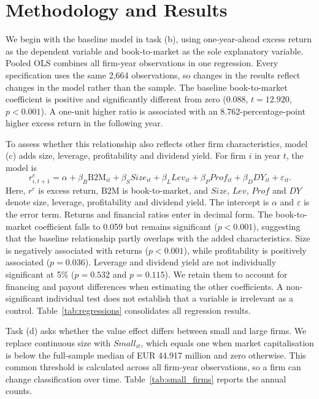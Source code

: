 \section*{Methodology and Results}

We begin with the baseline model in task (b), using one-year-ahead excess return as the dependent variable and book-to-market as the sole explanatory variable. Pooled OLS combines all firm-year observations in one regression. Every specification uses the same 2,664 observations, so changes in the results reflect changes in the model rather than the sample. The baseline book-to-market coefficient is positive and significantly different from zero (0.088, $t=12.920$, $p<0.001$). A one-unit higher ratio is associated with an 8.762-percentage-point higher excess return in the following year.

\newpage
To assess whether this relationship also reflects other firm characteristics, model (c) adds size, leverage, profitability and dividend yield. For firm $i$ in year $t$, the model is
\begin{equation}
r^e_{i,t+1}=\alpha+\beta_B \mathrm{B2M}_{it}+\beta_S Size_{it}
+\beta_L Lev_{it}+\beta_P Prof_{it}+\beta_D DY_{it}+\varepsilon_{it}.
\label{eq:controls}
\end{equation}
Here, $r^e$ is excess return, $\mathrm{B2M}$ is book-to-market, and $Size$, $Lev$, $Prof$ and $DY$ denote size, leverage, profitability and dividend yield. The intercept is $\alpha$ and $\varepsilon$ is the error term. Returns and financial ratios enter in decimal form. The book-to-market coefficient falls to 0.059 but remains significant ($p<0.001$), suggesting that the baseline relationship partly overlaps with the added characteristics. Size is negatively associated with returns ($p<0.001$), while profitability is positively associated ($p=0.036$). Leverage and dividend yield are not individually significant at 5\% ($p=0.532$ and $p=0.115$). We retain them to account for financing and payout differences when estimating the other coefficients. A non-significant individual test does not establish that a variable is irrelevant as a control. Table~\ref{tab:regressions} consolidates all regression results.



\newpage
Task (d) asks whether the value effect differs between small and large firms. We replace continuous size with $Small_{it}$, which equals one when market capitalisation is below the full-sample median of EUR 44.917 million and zero otherwise. This common threshold is calculated across all firm-year observations, so a firm can change classification over time. Table~\ref{tab:small_firms} reports the annual counts.

